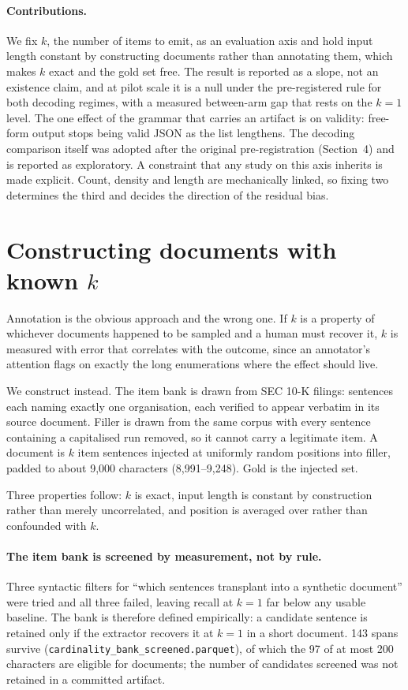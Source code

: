 \documentclass[11pt]{article}
\newcommand{\code}[1]{\texttt{\small #1}}
\begin{document}
\paragraph{Contributions.} We fix $k$, the number of items to emit, as an
evaluation axis and hold input length constant by constructing documents rather
than annotating them, which makes $k$ exact and the gold set free. The result is
reported as a slope, not an existence claim, and at pilot scale it is a null
under the pre-registered rule for both decoding regimes, with a measured
between-arm gap that rests on the $k = 1$ level. The one effect of the grammar
that carries an artifact is on validity: free-form output stops being valid JSON
as the list lengthens. The decoding comparison itself was adopted after the
original pre-registration (Section~4) and is reported as exploratory. A
constraint that any study on this axis inherits is made explicit. Count, density
and length are mechanically linked, so fixing two determines the third and
decides the direction of the residual bias.

\section{Constructing documents with known $k$}

Annotation is the obvious approach and the wrong one. If $k$ is a property of
whichever documents happened to be sampled and a human must recover it, $k$ is
measured with error that correlates with the outcome, since an annotator's
attention flags on exactly the long enumerations where the effect should live.

We construct instead. The item bank is drawn from SEC 10-K filings: sentences
each naming exactly one organisation, each verified to appear verbatim in its
source document. Filler is drawn from the same corpus with every sentence
containing a capitalised run removed, so it cannot carry a legitimate item. A
document is $k$ item sentences injected at uniformly random positions into
filler, padded to about 9{,}000 characters (8{,}991--9{,}248). Gold is the injected set.

Three properties follow: $k$ is exact, input length is constant by construction
rather than merely uncorrelated, and position is averaged over rather than
confounded with $k$.

\paragraph{The item bank is screened by measurement, not by rule.} Three
syntactic filters for ``which sentences transplant into a synthetic document''
were tried and all three failed, leaving recall at $k = 1$ far below any usable
baseline. The bank is therefore defined empirically: a candidate sentence is
retained only if the extractor recovers it at $k = 1$ in a short document. 143
spans survive (\code{cardinality\_bank\_screened.parquet}), of which the 97 of at
most 200 characters are eligible for documents; the number of candidates
screened was not retained in a committed artifact.
\end{document}
